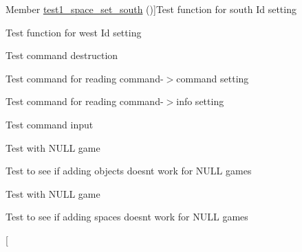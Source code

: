 \begin{DoxyRefList}
Member \hyperlink{space__test_8h_a21938e16547b3080e9251f960117a859}{test1\+\_\+space\+\_\+set\+\_\+south} ()]Test function for south Id setting  
\item[\label{test__test000223}%
\hypertarget{test__test000223}{}%
Member \hyperlink{space__test_8h_ab680a8797f793dffd58546074b87d21f}{test1\+\_\+space\+\_\+set\+\_\+west} ()]Test function for west Id setting  
\item[\label{test__test000003}%
\hypertarget{test__test000003}{}%
Member \hyperlink{command__test_8h_ad445f3e81035d4ab32ebc1526eb83fcb}{test2\+\_\+command\+\_\+destroy} ()]Test command destruction  
\item[\label{test__test000008}%
\hypertarget{test__test000008}{}%
Member \hyperlink{command__test_8h_a9c9d95687224d936e9486c0421969411}{test2\+\_\+command\+\_\+get\+\_\+command} ()]Test command for reading command-\/$>$command setting  
\item[\label{test__test000010}%
\hypertarget{test__test000010}{}%
Member \hyperlink{command__test_8h_a057697416fb8f5d97d82f18b5f231930}{test2\+\_\+command\+\_\+get\+\_\+info} ()]Test command for reading command-\/$>$info setting  
\item[\label{test__test000005}%
\hypertarget{test__test000005}{}%
Member \hyperlink{command__test_8h_a3ba7658db8aa069706b344d42ceabfaa}{test2\+\_\+command\+\_\+get\+\_\+user\+\_\+input} ()]Test command input  
\item[\label{test__test000086}%
\hypertarget{test__test000086}{}%
Member \hyperlink{game__test_8h_af5c4dd79b2a7b67adbeeb8df5791a5de}{test2\+\_\+game\+\_\+add\+\_\+link} ()]Test with N\+U\+LL game  
\item[\label{test__test000048}%
\hypertarget{test__test000048}{}%
Member \hyperlink{game__test_8h_ab996895e69c5d41fab5515e88aed3975}{test2\+\_\+game\+\_\+add\+\_\+object} ()]Test to see if adding objects doesn\textquotesingle{}t work for N\+U\+LL games  
\item[\label{test__test000043}%
\hypertarget{test__test000043}{}%
Member \hyperlink{game__test_8h_a42bb53c500bf8ae4dce0e144a85cd80b}{test2\+\_\+game\+\_\+add\+\_\+player} ()]Test with N\+U\+LL game  
\item[\label{test__test000039}%
\hypertarget{test__test000039}{}%
Member \hyperlink{game__test_8h_aed0f40f3ab1c252e548b038542d7409d}{test2\+\_\+game\+\_\+add\+\_\+space} ()]Test to see if adding spaces doesn\textquotesingle{}t work for N\+U\+LL games  
\item[\label{test__test000029}%
\hypertarget{test__test000029}{}%

\end{DoxyRefList}
